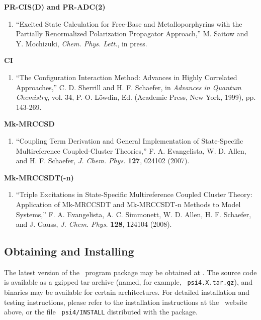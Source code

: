 {\bf PR-CIS(D) and PR-ADC(2)} 
\begin{enumerate}
\item ``Excited State Calculation for Free-Base and Metalloporphyrins with
  the Partially Renormalized Polarization Propagator Approach,''
  M. Saitow and Y. Mochizuki, {\em Chem. Phys. Lett.}, in press.
\end{enumerate}

{\bf CI} 
\begin{enumerate}
\item ``The Configuration Interaction Method: Advances in Highly 
   Correlated Approaches,'' C. D. Sherrill and H. F. Schaefer, in
   {\em Advances in Quantum Chemistry}, vol. 34, P.-O. L{\"o}wdin, Ed.
   (Academic Press, New York, 1999), pp. 143-269.
\end{enumerate}

{\bf Mk-MRCCSD} 
\begin{enumerate}
\item ``Coupling Term Derivation and General Implementation of
  State-Specific Multireference Coupled-Cluster Theories,''
  F. A. Evangelista, W. D. Allen, and H. F. Schaefer, 
  {\em J. Chem. Phys.} {\bf 127}, 024102 (2007).
\end{enumerate}

{\bf Mk-MRCCSDT(-n)} 
\begin{enumerate}
\item ``Triple Excitations in State-Specific Multireference Coupled
  Cluster Theory: Application of Mk-MRCCSDT and Mk-MRCCSDT-n Methods to
  Model Systems,'' F. A. Evangelista, A. C. Simmonett, W. D. Allen,
  H. F. Schaefer, and J. Gauss, {\em J. Chem. Phys.} {\bf 128}, 124104
  (2008).
\end{enumerate}

\subsection{Obtaining and Installing \PSIfour}
\label{installation}

The latest version of the \PSIfour\ program package may be obtained at
.  The
source code is available as a gzipped tar archive (named, for example, {\tt
psi4.X.tar.gz}), and binaries may be available for certain architectures.
For detailed installation and testing instructions, please refer to the
installation instructions at the \PSIfour\ website above, or the file {\tt
psi4/INSTALL} distributed with the package.

